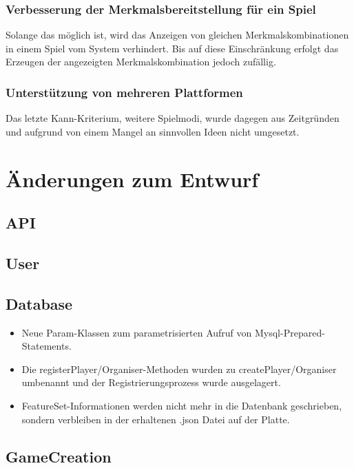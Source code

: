 \documentclass[a4paper]{scrreprt}
\begin{document}
\subsection{Verbesserung der Merkmalsbereitstellung für ein Spiel}
Solange das möglich ist, wird das Anzeigen von gleichen Merkmalskombinationen in einem Spiel vom System verhindert. Bis auf diese Einschränkung erfolgt das Erzeugen der angezeigten Merkmalskombination jedoch zufällig.


\subsection{Unterstützung von mehreren Plattformen}


\hspace{1cm}

Das letzte Kann-Kriterium, weitere Spielmodi, wurde dagegen aus Zeitgründen und aufgrund von einem Mangel an sinnvollen Ideen nicht umgesetzt.

\chapter{Änderungen zum Entwurf}
\section{API}

\section{User}

\section{Database}
\begin{itemize}
    \item Neue Param-Klassen zum parametrisierten Aufruf von Mysql-Prepared-Statements.
    \item Die registerPlayer/Organiser-Methoden wurden zu createPlayer/Organiser umbenannt und der Registrierungsprozess wurde ausgelagert.
    \item FeatureSet-Informationen werden nicht mehr in die Datenbank geschrieben, sondern verbleiben in der erhaltenen .json Datei auf der Platte.
\end{itemize}

\section{GameCreation}
\end{document}
